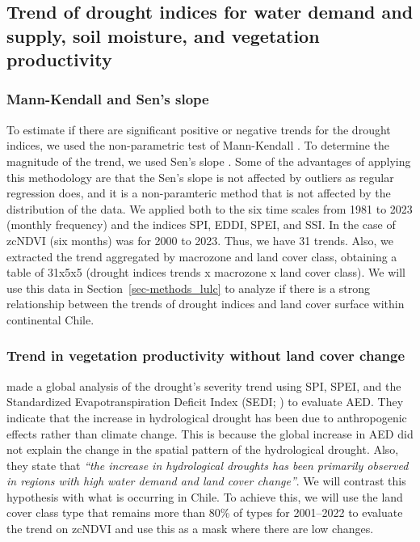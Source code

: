 \documentclass[
  authoryear,
  preprint,
  3p,
  onecolumn]{elsarticle}
\begin{document}
\hypertarget{trend-of-drought-indices-for-water-demand-and-supply-soil-moisture-and-vegetation-productivity}{%
\subsection{Trend of drought indices for water demand and supply, soil
moisture, and vegetation
productivity}\label{trend-of-drought-indices-for-water-demand-and-supply-soil-moisture-and-vegetation-productivity}}

\hypertarget{mann-kendall-and-sens-slope}{%
\subsubsection{Mann-Kendall and Sen's
slope}\label{mann-kendall-and-sens-slope}}

To estimate if there are significant positive or negative trends for the
drought indices, we used the non-parametric test of Mann-Kendall
\citep{Kendall1975}. To determine the magnitude of the trend, we used
Sen's slope \citep{Sen1968}. Some of the advantages of applying this
methodology are that the Sen's slope is not affected by outliers as
regular regression does, and it is a non-paramteric method that is not
affected by the distribution of the data. We applied both to the six
time scales from 1981 to 2023 (monthly frequency) and the indices SPI,
EDDI, SPEI, and SSI. In the case of zcNDVI (six months) was for 2000 to
2023. Thus, we have 31 trends. Also, we extracted the trend aggregated
by macrozone and land cover class, obtaining a table of 31x5x5 (drought
indices trends x macrozone x land cover class). We will use this data in
Section~\ref{sec-methods_lulc} to analyze if there is a strong
relationship between the trends of drought indices and land cover
surface within continental Chile.

\hypertarget{trend-in-vegetation-productivity-without-land-cover-change}{%
\subsubsection{Trend in vegetation productivity without land cover
change}\label{trend-in-vegetation-productivity-without-land-cover-change}}

\citet{Vicente-Serrano2021} made a global analysis of the drought's
severity trend using SPI, SPEI, and the Standardized Evapotranspiration
Deficit Index (SEDI; \citet{Vicente-Serrano2018}) to evaluate AED. They
indicate that the increase in hydrological drought has been due to
anthropogenic effects rather than climate change. This is because the
global increase in AED did not explain the change in the spatial pattern
of the hydrological drought. Also, they state that \emph{``the increase
in hydrological droughts has been primarily observed in regions with
high water demand and land cover change''}. We will contrast this
hypothesis with what is occurring in Chile. To achieve this, we will use
the land cover class type that remains more than 80\% of types for
2001--2022 to evaluate the trend on zcNDVI and use this as a mask where
there are low changes.
\end{document}
